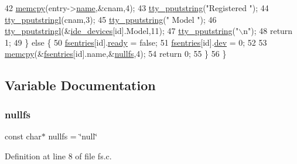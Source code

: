 \begin{DoxyCode}
42         \hyperlink{a00119_a370712322c794e949c996946f2283ea8_a370712322c794e949c996946f2283ea8}{memcpy}(entry->\hyperlink{a00242_a9c5a4f5b02eb2c9e9e797f79dc99028a_a9c5a4f5b02eb2c9e9e797f79dc99028a}{name},&cnam,4);
43         \hyperlink{a00149_ade960b1320324706aac6c00cc6b1b2fe_ade960b1320324706aac6c00cc6b1b2fe}{tty\_pputstring}(\textcolor{stringliteral}{"Registered "});
44         \hyperlink{a00149_abaf93f9e56ddb7b10462070f59e534e4_abaf93f9e56ddb7b10462070f59e534e4}{tty\_pputstringl}(cnam,3);
45         \hyperlink{a00149_ade960b1320324706aac6c00cc6b1b2fe_ade960b1320324706aac6c00cc6b1b2fe}{tty\_pputstring}(\textcolor{stringliteral}{" Model "});
46         \hyperlink{a00149_abaf93f9e56ddb7b10462070f59e534e4_abaf93f9e56ddb7b10462070f59e534e4}{tty\_pputstringl}(&\hyperlink{a00035_ab97a828ed4839b575dc382e2bf826e87_ab97a828ed4839b575dc382e2bf826e87}{ide\_devices}[\textcolor{keywordtype}{id}].Model,11);
47         \hyperlink{a00149_ade960b1320324706aac6c00cc6b1b2fe_ade960b1320324706aac6c00cc6b1b2fe}{tty\_pputstring}(\textcolor{stringliteral}{"\(\backslash\)n"});
48         \textcolor{keywordflow}{return} 1;
49     \} \textcolor{keywordflow}{else} \{
50         \hyperlink{a00137_a6b46131164b26e476762930c9aae4319_a6b46131164b26e476762930c9aae4319}{fsentries}[id].\hyperlink{a00242_a284522ed97fe1eeebd0fcc039b2ea00a_a284522ed97fe1eeebd0fcc039b2ea00a}{ready} = \textcolor{keyword}{false};
51         \hyperlink{a00137_a6b46131164b26e476762930c9aae4319_a6b46131164b26e476762930c9aae4319}{fsentries}[id].\hyperlink{a00242_aaea66ea744fa50f1c54666033884d8d2_aaea66ea744fa50f1c54666033884d8d2}{dev} = 0;
52 
53         \hyperlink{a00119_a370712322c794e949c996946f2283ea8_a370712322c794e949c996946f2283ea8}{memcpy}(&\hyperlink{a00137_a6b46131164b26e476762930c9aae4319_a6b46131164b26e476762930c9aae4319}{fsentries}[\textcolor{keywordtype}{id}].name,&\hyperlink{a00134_a36265ac74fd925405e1179e799961f1e_a36265ac74fd925405e1179e799961f1e}{nullfs},4);
54         \textcolor{keywordflow}{return} 0;
55     \} 
56 \}
\end{DoxyCode}


\subsection{Variable Documentation}
\mbox{\label{a00134_a36265ac74fd925405e1179e799961f1e_a36265ac74fd925405e1179e799961f1e}} 
\subsubsection{\texorpdfstring{nullfs}{nullfs}}
{\footnotesize\ttfamily const char$\ast$ nullfs = \char`\"{}null\char`\"{}}



Definition at line 8 of file fs.\+c.

